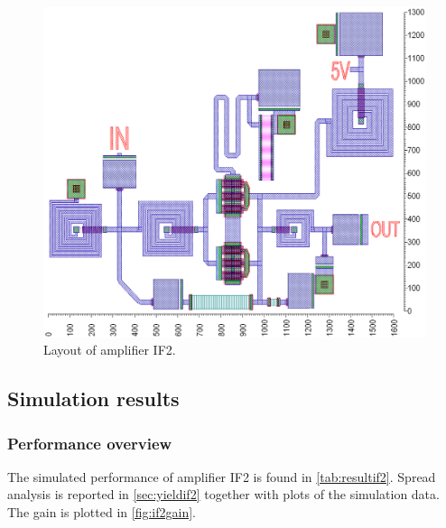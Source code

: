 			\begin{figure}[hbt!]
				\centering
				\includegraphics[width=1.0\textwidth]{fig/amplifiers/if2/layout}
				\caption[Amplifier IF2 layout.]{Layout of amplifier IF2.\scalemum}\label{fig:if2layout}
			\end{figure}

		\subsection{Simulation results}
			\subsubsection{Performance overview}
				The simulated performance of amplifier IF2 is found in \autoref{tab:resultif2}. Spread analysis is reported in \autoref{sec:yieldif2} together with plots of the simulation data. The gain is plotted in \autoref{fig:if2gain}.
				

